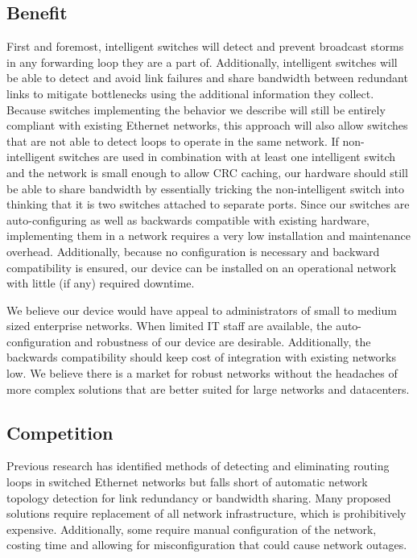   \subsection{Benefit}
    First and foremost, intelligent switches will detect and prevent broadcast storms in any forwarding loop they are a part of.
	  Additionally, intelligent switches will be able to detect and avoid link failures and share bandwidth between redundant links to mitigate bottlenecks using the additional information they collect.
	  Because switches implementing the behavior we describe will still be entirely compliant with existing Ethernet networks, this approach will also allow switches that are not able to detect loops to operate in the same network.
	  If non-intelligent switches are used in combination with at least one intelligent switch and the network is small enough to allow CRC caching, our hardware should still be able to share bandwidth by essentially tricking the non-intelligent switch into thinking that it is two switches attached to separate ports.
	  Since our switches are auto-configuring as well as backwards compatible with existing hardware, implementing them in a network requires a very low installation and maintenance overhead.
	  Additionally, because no configuration is necessary and backward compatibility is ensured, our device can be installed on an operational network with little (if any) required downtime.
	
	  We believe our device would have appeal to administrators of small to medium sized enterprise networks.
	  When limited IT staff are available, the auto-configuration and robustness of our device are desirable.
	  Additionally, the backwards compatibility should keep cost of integration with existing networks low.
	  We believe there is a market for robust networks without the headaches of more complex solutions that are better suited for large networks and datacenters.
  \subsection{Competition}
	  Previous research has identified methods of detecting and eliminating routing loops in switched Ethernet networks but falls short of automatic network topology detection for link redundancy or bandwidth sharing.
	  Many proposed solutions require replacement of all network infrastructure, which is prohibitively expensive.
	  Additionally, some require manual configuration of the network, costing time and allowing for misconfiguration that could cause network outages.
	
